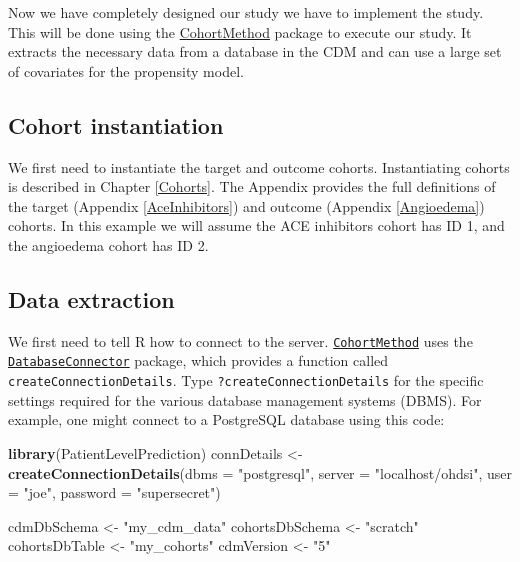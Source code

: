 \documentclass[]{book}
\newenvironment{Shaded}{\begin{snugshade}}{\end{snugshade}}
\newcommand{\KeywordTok}[1]{\textcolor[rgb]{0.13,0.29,0.53}{\textbf{#1}}}
\newcommand{\DataTypeTok}[1]{\textcolor[rgb]{0.13,0.29,0.53}{#1}}
\newcommand{\StringTok}[1]{\textcolor[rgb]{0.31,0.60,0.02}{#1}}
\newcommand{\NormalTok}[1]{#1}
\begin{document}
Now we have completely designed our study we have to implement the
study. This will be done using the
\href{https://ohdsi.github.io/CohortMethod/}{CohortMethod} package to
execute our study. It extracts the necessary data from a database in the
CDM and can use a large set of covariates for the propensity model.

\subsection{Cohort instantiation}\label{cohort-instantiation}

We first need to instantiate the target and outcome cohorts.
Instantiating cohorts is described in Chapter \ref{Cohorts}. The
Appendix provides the full definitions of the target (Appendix
\ref{AceInhibitors}) and outcome (Appendix \ref{Angioedema}) cohorts. In
this example we will assume the ACE inhibitors cohort has ID 1, and the
angioedema cohort has ID 2.

\subsection{Data extraction}\label{data-extraction}

We first need to tell R how to connect to the server.
\href{https://ohdsi.github.io/CohortMethod/}{\texttt{CohortMethod}} uses
the
\href{https://ohdsi.github.io/DatabaseConnector/}{\texttt{DatabaseConnector}}
package, which provides a function called
\texttt{createConnectionDetails}. Type \texttt{?createConnectionDetails}
for the specific settings required for the various database management
systems (DBMS). For example, one might connect to a PostgreSQL database
using this code:

\begin{Shaded}
\begin{Highlighting}[]
\KeywordTok{library}\NormalTok{(PatientLevelPrediction)}
\NormalTok{connDetails <-}\StringTok{ }\KeywordTok{createConnectionDetails}\NormalTok{(}\DataTypeTok{dbms =} \StringTok{"postgresql"}\NormalTok{,}
                                       \DataTypeTok{server =} \StringTok{"localhost/ohdsi"}\NormalTok{,}
                                       \DataTypeTok{user =} \StringTok{"joe"}\NormalTok{,}
                                       \DataTypeTok{password =} \StringTok{"supersecret"}\NormalTok{)}

\NormalTok{cdmDbSchema <-}\StringTok{ "my_cdm_data"}
\NormalTok{cohortsDbSchema <-}\StringTok{ "scratch"}
\NormalTok{cohortsDbTable <-}\StringTok{ "my_cohorts"}
\NormalTok{cdmVersion <-}\StringTok{ "5"}
\end{Highlighting}
\end{Shaded}
\end{document}
